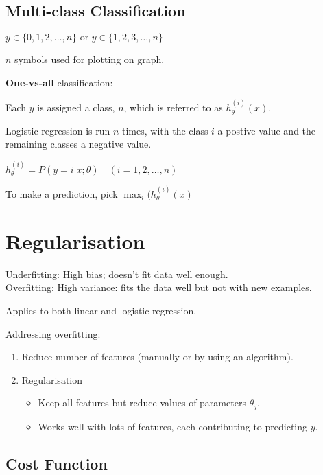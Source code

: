 \documentclass[12pt] {article}
\begin{document}
  \subsection{Multi-class Classification}

    $y\in\{0,1,2,\dots,n\} \text{ or } y\in\{1,2,3,\dots,n\}$

    $n$ symbols used for plotting on graph.

    \textbf{One-vs-all} classification:

    Each $y$ is assigned a class, $n$, which is referred to as 
    $h_\theta^{(i)}(x)$.

    Logistic regression is run $n$ times, with the class $i$ a postive value and
    the remaining classes a negative value. 

    $h_\theta^{(i)} = P(y=i|x;\theta) \hspace{1em} (i = 1, 2,\dots,n)$

    To make a prediction, pick $\max_i(h_\theta^{(i)}(x)$

    \newpage

\section{Regularisation}

  Underfitting: High bias; doesn't fit data well enough.\\
  Overfitting: High variance: fits the data well but not with new examples.

  Applies to both linear and logistic regression.

  Addressing overfitting:
  \vspace{-1em}
  \begin{enumerate}
    \item Reduce number of features (manually or by using an algorithm).
    \item Regularisation
      \begin{itemize}
        \item Keep all features but reduce values of parameters $\theta_j$.
        \item Works well with lots of features, each contributing to 
          predicting $y$.
      \end{itemize}
  \end{enumerate}

  \subsection{Cost Function}
\end{document}
